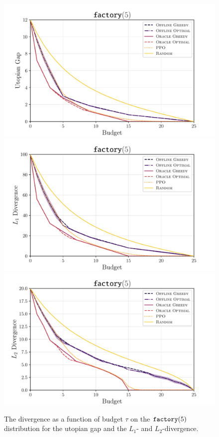 \begin{figure}[t!]
  \centering
	\includegraphics[width=\stdfigwidth]{figures/exploitability_predictible_factory5.pdf}
	\includegraphics[width=\stdfigwidth]{figures/l1_norm_predictible_factory5.pdf}
	\includegraphics[width=\stdfigwidth]{figures/l2_norm_predictible_factory5.pdf}
	\caption{ The divergence as a function of budget $ \tau $ on the $ \factory[5] $ distribution for the utopian gap \citep[][Figure 1]{uradnik2024reducing} and the $ L_1 $- and $ L_2 $-divergence.}
	\label{fig:factory}
\end{figure}
